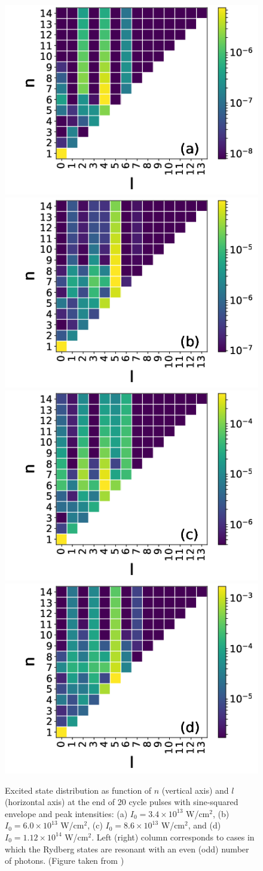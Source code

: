 \begin{figure}[!ht]
\centering
\includegraphics[width=0.32\columnwidth]{figs/Rydberg/heat_20_cyc_3p4e13_rev.png}
\includegraphics[width=0.32\columnwidth]{figs/Rydberg/heat_20_cyc_6p0e13_rev.png}\\
\includegraphics[width=0.32\columnwidth]{figs/Rydberg/heat_20_cyc_8p6e13_rev.png}
\includegraphics[width=0.32\columnwidth]{figs/Rydberg/heat_20_cyc_11p2e13_rev.png}
\caption{\label{fig:parity}
Excited state distribution as function of $n$ (vertical axis) and $l$ (horizontal axis) at the end of 20 cycle pulses with sine-squared envelope and peak intensities: 
(a) $I_0 = 3.4\times10^{13}$ W/cm$^2$, 
(b) $I_0 = 6.0\times10^{13}$ W/cm$^2$, 
(c) $I_0 = 8.6\times10^{13}$ W/cm$^2$, and 
(d) $I_0 = 1.12\times10^{14}$ W/cm$^2$. 
Left (right) column corresponds to cases in which the Rydberg states are resonant with an even (odd) number of photons. (Figure taken from \cite{venzke2018_ryd})
}
\end{figure}

